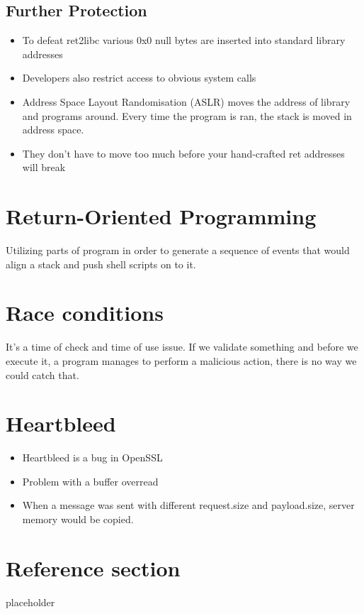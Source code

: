 \documentclass{article}
\begin{document}
\subsection{Further Protection}
\begin{itemize}
  \item To defeat ret2libc various 0x0 null bytes are inserted into standard library addresses 
  \item Developers also restrict access to obvious system calls 
  \item Address Space Layout Randomisation (ASLR) moves the address of library and programs around. Every time the program is ran, the stack is moved in address space. 
  \item They don’t have to move too much before your hand-crafted ret addresses will break
\end{itemize}

\section{Return-Oriented Programming}
\begin{flushleft}
Utilizing parts of program in order to generate a sequence of events that would align a stack and push shell scripts on to it.
\end{flushleft}

\section{Race conditions}
\begin{flushleft}
It's a time of check and time of use issue. If we validate something and before we execute it, a program manages to perform a malicious action, there is no way we could catch that.
\end{flushleft}

\section{Heartbleed}
\begin{itemize}
  \item Heartbleed is a bug in OpenSSL
  \item Problem with a buffer overread
  \item When a message was sent with different request.size and payload.size, server memory would be copied.
\end{itemize}


\pagebreak
\section*{Reference section} \label{sec:reference}
\begin{description}
	\item[placeholder] \hfill \\
\end{description}
\end{document}
